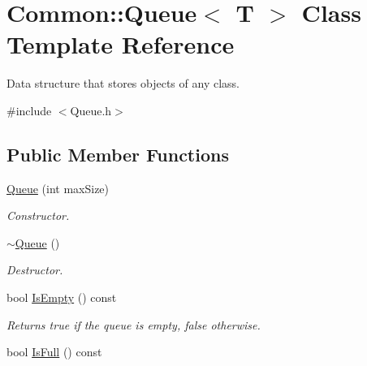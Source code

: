 \hypertarget{class_common_1_1_queue}{\section{Common\-:\-:Queue$<$ T $>$ Class Template Reference}
\label{class_common_1_1_queue}
}


Data structure that stores objects of any class.  




{\ttfamily \#include $<$Queue.\-h$>$}

\subsection*{Public Member Functions}
\begin{DoxyCompactItemize}
\item 
\hypertarget{class_common_1_1_queue_a49b72b9ada539f35ee458059d6041c55}{\hyperlink{class_common_1_1_queue_a49b72b9ada539f35ee458059d6041c55}{Queue} (int max\-Size)}\label{class_common_1_1_queue_a49b72b9ada539f35ee458059d6041c55}

\begin{DoxyCompactList}\small\item\em Constructor. \end{DoxyCompactList}\item 
\hypertarget{class_common_1_1_queue_a00d119db8fa3050da37746e82cbcf94f}{\hyperlink{class_common_1_1_queue_a00d119db8fa3050da37746e82cbcf94f}{$\sim$\-Queue} ()}\label{class_common_1_1_queue_a00d119db8fa3050da37746e82cbcf94f}

\begin{DoxyCompactList}\small\item\em Destructor. \end{DoxyCompactList}\item 
\hypertarget{class_common_1_1_queue_af062eb59a24128f6f431423f6e96b30f}{bool \hyperlink{class_common_1_1_queue_af062eb59a24128f6f431423f6e96b30f}{Is\-Empty} () const }\label{class_common_1_1_queue_af062eb59a24128f6f431423f6e96b30f}

\begin{DoxyCompactList}\small\item\em Returns true if the queue is empty, false otherwise. \end{DoxyCompactList}\item 
\hypertarget{class_common_1_1_queue_a7423fbabf9eb5c6107efabd7f3e55492}{bool \hyperlink{class_common_1_1_queue_a7423fbabf9eb5c6107efabd7f3e55492}{Is\-Full} () const }\label{class_common_1_1_queue_a7423fbabf9eb5c6107efabd7f3e55492}


\end{DoxyCompactItemize}
